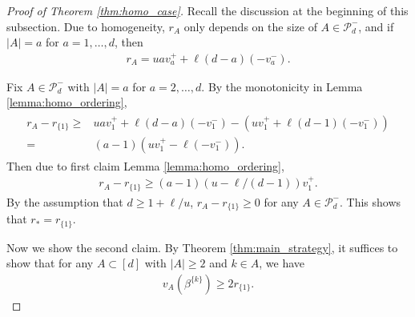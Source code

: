 \documentclass[aap,preprint]{imsart}
\theoremstyle{plain}
\theoremstyle{definition}
\begin{document}
\begin{appendix}
\begin{proof}[Proof of Theorem \ref{thm:homo_case}]
Recall the discussion at the beginning of this subsection. Due to homogeneity, $r_A$ only depends on the size of $A \in \mathcal{P}_{d}^{-}$, and if $|A| = a$ for $a = 1,\ldots,d$, then
\begin{align*}
    r_A = u a v_a^{+} + \ell (d-a)(-v_a^{-}).
\end{align*}

Fix $A \in \mathcal{P}_{d}^{-}$ with $|A| = a$ for $a = 2,\ldots,d$. By the monotonicity in Lemma \ref{lemma:homo_ordering}, 
\begin{align}\label{aux_rA_minus_r1}
\begin{split}
        r_A - r_{\{1\}} \geq & u a v_1^{+} + \ell (d-a)(-v_1^{-}) - \left(u v_1^{+} + \ell (d-1) (-v_1^{-}) \right)  \\
    =& (a-1) \left( u v_1^{+} - \ell (-v_1^{-}) \right).
    \end{split}
\end{align}
Then due to first claim Lemma \ref{lemma:homo_ordering}, 
\begin{align*}
    r_A - r_{\{1\}} \geq (a-1)\left( u - \ell/(d-1)\right) v_1^{+}.
\end{align*}
By the assumption that $d \geq 1+\ell/u$,  $r_A - r_{\{1\}} \geq 0$ for any $A \in \mathcal{P}_d^{-}$. This shows that 
$r_* = r_{\{1\}}$.

Now we show the second claim. By Theorem \ref{thm:main_strategy}, it suffices to show that for any $A \subset [d]$ with $|A| \geq 2$ and $k \in A$, we have
\begin{align*}
v_A(\beta^{\{k\}}) 
\geq 2  r_{\{1\}}.    
\end{align*}


\end{proof}
\end{appendix}
\end{document}
